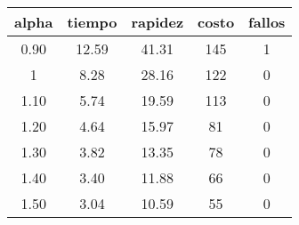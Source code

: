 \begin{table}[h!]
\centering
\begin{tabular}{ccccc}
alpha & tiempo & rapidez & costo & fallos \\ 
\hline 
0.90 & 12.59 & 41.31 & 145 & 1 \\ 
1 & 8.28 & 28.16 & 122 & 0 \\ 
1.10 & 5.74 & 19.59 & 113 & 0 \\ 
1.20 & 4.64 & 15.97 & 81 & 0 \\ 
1.30 & 3.82 & 13.35 & 78 & 0 \\ 
1.40 & 3.40 & 11.88 & 66 & 0 \\ 
1.50 & 3.04 & 10.59 & 55 & 0 \\ 
\hline 
\end{tabular}
\end{table}